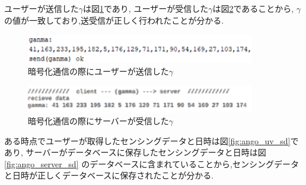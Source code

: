 ユーザーが送信した$\gamma$は図\ref{fig:ninsyo_uv_gamma}であり,
ユーザーが受信した$\gamma$は図\ref{fig:ninsyo_server_gamma}であることから,
$\gamma$の値が一致しており,送受信が正しく行われたことが分かる.

\begin{figure}[H]
\begin{center}
	\includegraphics[width=10cm]{ninsyo_uv_gamma.png}
	\caption{暗号化通信の際にユーザーが送信した$\gamma$}
	\label{fig:ninsyo_uv_gamma}
\end{center}
\end{figure}
\begin{figure}[H]
\begin{center}
	\includegraphics[width=10cm]{ninsyo_server_gamma.png}
	\caption{暗号化通信の際にサーバーが受信した$\gamma$}
	\label{fig:ninsyo_server_gamma}
\end{center}
\end{figure}

ある時点でユーザーが取得したセンシングデータと日時は図\ref{fig:ango_uv_sd}であり,
サーバーがデータベースに保存したセンシングデータと日時は図\ref{fig:ango_server_sd}
のデータベースに含まれていることから,センシングデータと日時が正しくデータベースに保存されたことが分かる.

